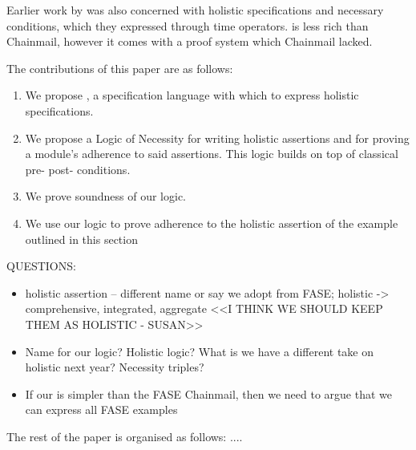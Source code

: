  Earlier work by \cite{fase} was also concerned with 
 holistic specifications and necessary conditions, which they expressed through time operators.
 \Chainmail is less rich than Chainmail, however it comes with a proof system which Chainmail lacked.
 
  
 The contributions of this paper are as follows:
 
 \begin{enumerate}
 \item
 We propose \Chainmail, a specification language with which to
express holistic specifications. 
 \item
 We propose a Logic of Necessity for writing holistic assertions and for proving a module's adherence to said assertions.
 This logic builds on top of classical pre- post- conditions.
 \item
 We prove soundness of our logic.  
 \item
 We use our logic to prove adherence to the holistic assertion of the example
outlined  in this section
 \end{enumerate}
 
 QUESTIONS:
 \begin{itemize}
 \item
 holistic assertion -- different name or say we adopt from FASE; holistic -> comprehensive, integrated, aggregate <<I THINK WE SHOULD KEEP THEM AS HOLISTIC  - SUSAN>>
 \item
 Name for our logic?  Holistic logic? What is we have a different take on holistic next year? Necessity triples? 
\item
If our \Chainmail is simpler than the FASE Chainmail, then we need to argue that we can express all FASE examples
 \end{itemize}
  
The rest of the paper is organised as follows: .... 

